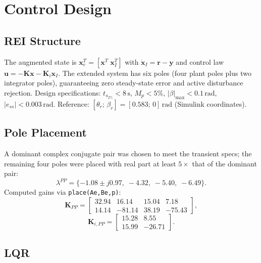 \documentclass[conference]{IEEEtran}
\begin{document}
\section{Control Design}
\label{sec:control}

\subsection{REI Structure}

The augmented state is $\mathbf{x}_e^T = [\mathbf{x}^T\; \mathbf{x}_I^T]$ with $\dot{\mathbf{x}}_I = \mathbf{r} - \mathbf{y}$ and control law $\mathbf{u} = -\mathbf{K}\mathbf{x} - \mathbf{K}_i\mathbf{x}_I$. The extended system has six poles (four plant poles plus two integrator poles), guaranteeing zero steady-state error and active disturbance rejection. Design specifications: $t_{s_{2\%}} < 8\,\text{s}$, $M_p < 5\%$, $|\beta|_{\max} < 0.1\,\text{rad}$, $|e_{ss}| < 0.003\,\text{rad}$. Reference: $[\theta_r;\,\beta_r] = [0.583;\,0]\,\text{rad}$ (Simulink coordinates).

\subsection{Pole Placement}

A dominant complex conjugate pair was chosen to meet the transient specs; the remaining four poles were placed with real part at least $5\times$ that of the dominant pair:
\begin{equation}
\lambda^{PP} = \{-1.08 \pm j0.97,\; -4.32,\; -5.40,\; -6.49\}.
\end{equation}
Computed gains via \texttt{place(Ae,Be,p)}:
\begin{equation}
\mathbf{K}_{PP} = \begin{bmatrix} 32.94 & 16.14 & 15.04 & 7.18 \\ 14.14 & -81.14 & 38.19 & -75.43 \end{bmatrix},
\end{equation}
\begin{equation}
\mathbf{K}_{i,PP} = \begin{bmatrix} 15.28 & 8.55 \\ 15.99 & -26.71 \end{bmatrix}.
\end{equation}

\subsection{LQR}
\end{document}
